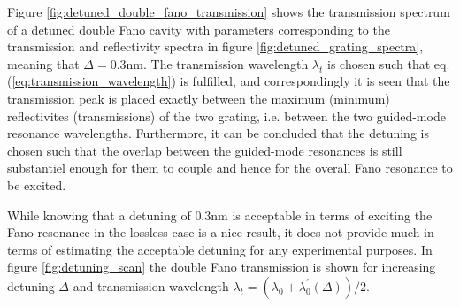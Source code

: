 Figure \ref{fig:detuned_double_fano_transmission} shows the transmission spectrum of a detuned double Fano cavity with parameters corresponding to the transmission and reflectivity spectra in figure \ref{fig:detuned_grating_spectra}, meaning that $\Delta = 0.3$nm. The transmission wavelength $\lambda_t$ is chosen such that eq. (\ref{eq:transmission_wavelength}) is fulfilled, and correspondingly it is seen that the transmission peak is placed exactly between the maximum (minimum) reflectivites (transmissions) of the two grating, i.e. between the two guided-mode resonance wavelengths. Furthermore, it can be concluded that the detuning is chosen such that the overlap between the guided-mode resonances is still substantiel enough for them to couple and hence for the overall Fano resonance to be excited. 

While knowing that a detuning of $0.3$nm is acceptable in terms of exciting the Fano resonance in the lossless case is a nice result, it does not provide much in terms of estimating the acceptable detuning for any experimental purposes. In figure \ref{fig:detuning_scan} the double Fano transmission is shown for increasing detuning $\Delta$ and transmission wavelength $\lambda_t = (\lambda_{0} + \lambda_{0}^{\prime}(\Delta))/2$. 

